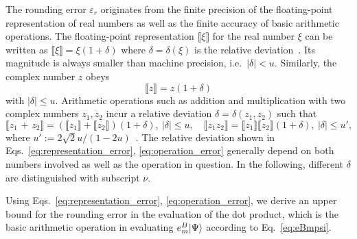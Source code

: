 The rounding error $\varepsilon_r$ originates from the finite precision of the floating-point representation of real numbers as well as the finite accuracy of basic arithmetic operations. The floating-point representation  $\llbracket \xi \rrbracket$ for the real number $\xi $ can be written as $\llbracket \xi \rrbracket=\xi(1+\delta)$ where $\delta=\delta(\xi)$ is the relative deviation~\cite{higham2002accuracy}. Its magnitude is always smaller than machine precision, i.e.\ $|\delta|<u$. Similarly, the complex number $z$ obeys 
\begin{equation}
    \label{eq:representation_error}
    \llbracket z\rrbracket=z(1+\delta)
\end{equation}
with $|\delta|\leq u$. Arithmetic operations such as addition and multiplication with two complex numbers $z_1, z_2$ incur a relative deviation $\delta=\delta(z_1,z_2)$ such that 
\begin{equation}
\label{eq:operation_error}
    \llbracket z_1 \text{ + } z_2\rrbracket =(\llbracket z_1 \rrbracket+\llbracket z_2\rrbracket)(1+\delta),\ |\delta|\leq u, \quad\llbracket z_1 z_2 \rrbracket=\llbracket z_1\rrbracket \llbracket z_2\rrbracket(1+\delta),\ |\delta|\leq u',
\end{equation}
where $u':=2\sqrt{2}u/(1-2u)$~\cite{higham2002accuracy}. The relative deviation shown in Eqs.~\eqref{eq:representation_error}, \eqref{eq:operation_error} generally depend on both numbers involved as well as the operation in question. In the following, different $\delta$ are distinguished with subscript $\nu$.

Using Eqs.~\eqref{eq:representation_error}, \eqref{eq:operation_error}, we derive an upper bound for the rounding error in the evaluation of the dot product, which is the basic arithmetic operation in evaluating $e^B_m|\Psi\rangle$ according to Eq.~\eqref{eq:eBmpsi}.

